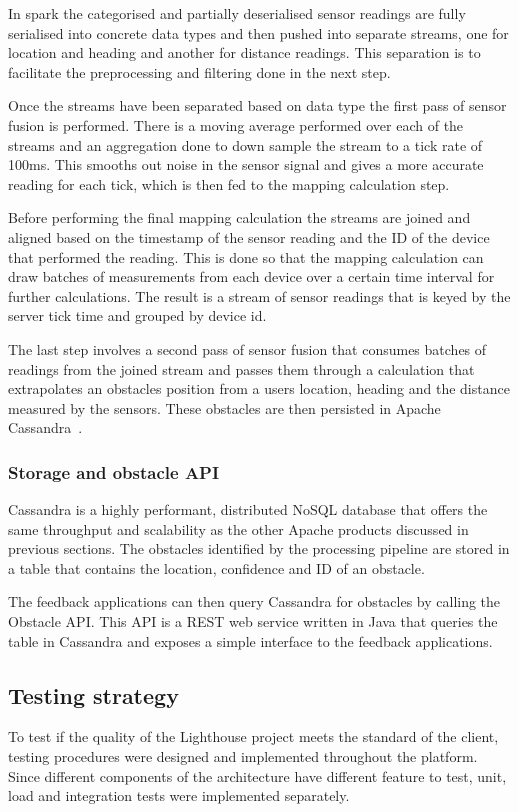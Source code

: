\documentclass[prodmode,acmtosem]{acmsmall} %
\begin{document}
In spark the categorised and partially deserialised sensor readings are fully serialised into concrete data types and then pushed into separate streams, one for location and heading and another for distance readings. This separation is to facilitate the preprocessing and filtering done in the next step. 

Once the streams have been separated based on data type the first pass of sensor fusion is performed. There is a moving average performed over each of the streams and an aggregation done to down sample the stream to a tick rate of 100ms. This smooths out noise in the sensor signal and gives a more accurate reading for each tick, which is then fed to the mapping calculation step.

Before performing the final mapping calculation the streams are joined and aligned based on the timestamp of the sensor reading and the ID of the device that performed the reading. This is done so that the mapping calculation can draw batches of measurements from each device over a certain time interval for further calculations. The result is a stream of sensor readings that is keyed by the server tick time and grouped by device id.

The last step involves a second pass of sensor fusion that consumes batches of readings from the joined stream and passes them through a calculation that extrapolates an obstacles position from a users location, heading and the distance measured by the sensors. These obstacles are then persisted in Apache Cassandra~\cite{ApacheCassandra}.

\subsubsection{Storage and obstacle API}
Cassandra is a highly performant, distributed NoSQL database that offers the same throughput and scalability as the other Apache products discussed in previous sections. The obstacles identified by the processing pipeline are stored in a table that contains the location, confidence and ID of an obstacle.

The feedback applications can then query Cassandra for obstacles by calling the Obstacle API. This API is a REST web service written in Java that queries the table in Cassandra and exposes a simple interface to the feedback applications.


\subsection{Testing strategy}
To test if the quality of the Lighthouse project meets the standard of the client, testing procedures were designed and implemented throughout the platform. Since different components of the architecture have different feature to test, unit, load and integration tests were implemented separately.
\end{document}
